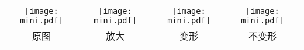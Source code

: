 \centering
\begin{tabular}{cccc}
    \texttt{[image: mini.pdf]} & 
    \texttt{[image: mini.pdf]} &
    \texttt{[image: mini.pdf]} &
    \texttt{[image: mini.pdf]} \\
    原图 & 放大 & 变形 & 不变形 \\
\end{tabular}

